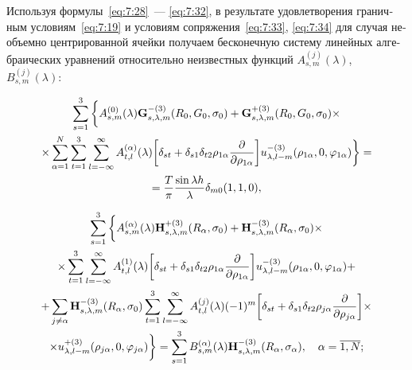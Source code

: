 \begin{russian}
Используя формулы~\eqref{eq:7:28}~--- \eqref{eq:7:32}, в результате удовлетворения граничным условиям~\eqref{eq:7:19} и условиям сопряжения~\eqref{eq:7:33}, \eqref{eq:7:34} для случая необъемно центрированной ячейки получаем бесконечную систему линейных алгебраических уравнений относительно неизвестных функций $A_{s,m}^{(j)}(\lambda)$, $B_{s,m}^{(j)}(\lambda)$:

\begin{multline}
\sum\limits_{s = 1}^3 \bigg\{  A_{s,m}^{(0)}(\lambda ){\bf{G}}_{s,\lambda ,m}^{ - (3)}({R_0},{G_0},{\sigma _0}) + {\bf{G}}_{s,\lambda ,m}^{ + (3)}({R_0},{G_0},{\sigma _0}) \times \\
\times \sum\limits_{\alpha  = 1}^N {\sum\limits_{t = 1}^3 {\sum\limits_{l =  - \infty }^\infty  {A_{t,l}^{(\alpha )}} } } (\lambda )\bigg[{\delta _{st}} + {\delta _{s1}}{\delta _{t2}}{\rho _{1\alpha }}\frac{\partial }{{\partial {\rho _{1\alpha }}}}\bigg]u_{\lambda ,l - m}^{ - (3)}({\rho _{1\alpha }},0,{\varphi _{1\alpha }})\bigg\}  = \\
= \frac{T}{\pi }\frac{{\sin \lambda h}}{\lambda }{\delta _{m0}}(1,1,0),
\end{multline}

\begin{multline}
\sum\limits_{s = 1}^3 \bigg\{  A_{s,m}^{(\alpha )}(\lambda ){\bf{H}}_{s,\lambda ,m}^{ + (3)}({R_\alpha },{\sigma _0}) + {\bf{H}}_{s,\lambda ,m}^{ - (3)}({R_\alpha },{\sigma _0}) \times \\
\times \sum\limits_{t = 1}^3 {\sum\limits_{l =  - \infty }^\infty  {A_{t,l}^{(1)}} } (\lambda )\bigg[{\delta _{st}} + {\delta _{s1}}{\delta _{t2}}{\rho _{1\alpha }}\frac{\partial }{{\partial {\rho _{1\alpha }}}}\bigg]u_{\lambda ,l - m}^{ - (3)}({\rho _{1\alpha }},0,{\varphi _{1\alpha }}) + \\
+ \sum\limits_{j \ne \alpha } {{\bf{H}}_{s,\lambda ,m}^{ - (3)}} ({R_\alpha },{\sigma _0})\sum\limits_{t = 1}^3 {\sum\limits_{l =  - \infty }^\infty  {A_{t,l}^{(j)}} } (\lambda ){( - 1)^m}\bigg[{\delta _{st}} + {\delta _{s1}}{\delta _{t2}}{\rho _{j\alpha }}\frac{\partial }{{\partial {\rho _{j\alpha }}}}\bigg] \times \\
\times u_{\lambda ,l - m}^{ + (3)}({\rho _{j\alpha }},0,{\varphi _{j\alpha }})\bigg\}  = \sum\limits_{s = 1}^3 {B_{s,m}^{(\alpha )}} (\lambda ){\bf{H}}_{s,\lambda ,m}^{ - (3)}({R_\alpha },{\sigma _\alpha }),\;\;\;{\mkern 1mu} {\kern 1pt} \alpha  = \overline {1,N};
\end{multline}


\end{russian}

